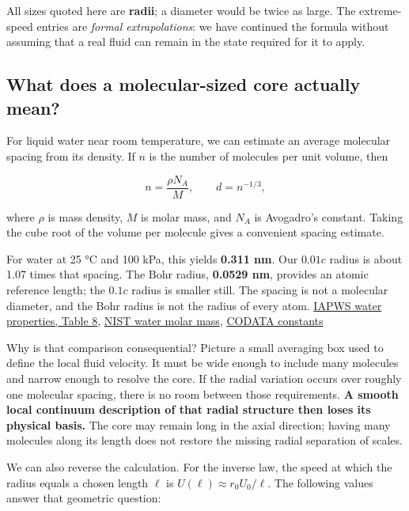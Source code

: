 \documentclass[
  english,
  11pt,
]{article}
\begin{document}
All sizes quoted here are \textbf{radii}; a diameter would be twice as
large. The extreme-speed entries are \emph{formal extrapolations}: we
have continued the formula without assuming that a real fluid can remain
in the state required for it to apply.

\subsection{What does a molecular-sized core actually
mean?}\label{what-does-a-molecular-sized-core-actually-mean}

For liquid water near room temperature, we can estimate an average
molecular spacing from its density. If \(n\) is the number of molecules
per unit volume, then

\[
n=\frac{\rho N_A}{M},
\qquad
d=n^{-1/3},
\]

where \(\rho\) is mass density, \(M\) is molar mass, and \(N_A\) is
Avogadro's constant. Taking the cube root of the volume per molecule
gives a convenient spacing estimate.

For water at 25 °C and 100 kPa, this yields \textbf{0.311 nm}. Our
\(0.01c\) radius is about 1.07 times that spacing. The Bohr radius,
\textbf{0.0529 nm}, provides an atomic reference length; the \(0.1c\)
radius is smaller still. The spacing is not a molecular diameter, and
the Bohr radius is not the radius of every atom.
\href{https://iapws.org/technical-guidance/release/LiquidWater.download}{IAPWS
water properties, Table 8},
\href{https://webbook.nist.gov/cgi/cbook.cgi?Name=water}{NIST water
molar mass},
\href{https://physics.nist.gov/cuu/Constants/Table/allascii.txt}{CODATA
constants}

Why is that comparison consequential? Picture a small averaging box used
to define the local fluid velocity. It must be wide enough to include
many molecules and narrow enough to resolve the core. If the radial
variation occurs over roughly one molecular spacing, there is no room
between those requirements. \textbf{A smooth local continuum description
of that radial structure then loses its physical basis.} The core may
remain long in the axial direction; having many molecules along its
length does not restore the missing radial separation of scales.

We can also reverse the calculation. For the inverse law, the speed at
which the radius equals a chosen length \(\ell\) is
\(U(\ell)\approx r_0U_0/\ell\). The following values answer that
geometric question:
\end{document}
